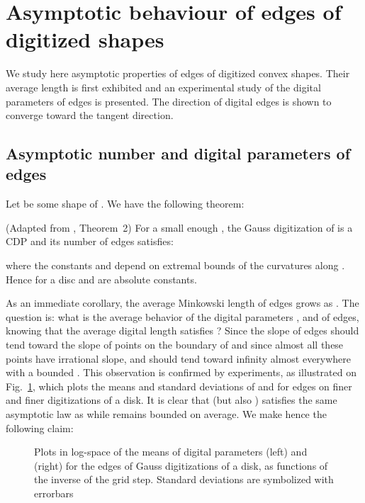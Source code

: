 \documentclass{llncs}
\newcommand{\refFigure}[1]{Fig.~\ref{#1}}
\begin{document}
\section{Asymptotic behaviour of edges of digitized shapes}

We study here asymptotic properties of edges of digitized convex
shapes. Their average length is first exhibited and an experimental
study of the digital parameters of edges is presented. The direction of
digital edges is shown to converge toward the tangent direction. 

\subsection{Asymptotic number and digital parameters of edges}

Let  be some shape of . We have the following theorem:

\begin{theorem}{(Adapted from \cite{Balog1991}, Theorem~2)}
  \label{thm:Balog:nbV1} 
  For a small enough , the Gauss digitization  of 
  is a CDP and its number of edges  
  satisfies:
  
  where the constants  and  depend on extremal
  bounds of the curvatures along . Hence for a disc  and
   are absolute constants.
\end{theorem}

As an immediate corollary, the average Minkowski 
length of edges grows as . The question is:
what is the average behavior of the digital parameters ,  and
 of edges, knowing that the average digital length
 satisfies
 ? Since the slope
of edges should tend toward the slope of points on the boundary of 
and since almost all these points have irrational slope,  and 
should tend toward infinity almost everywhere with a bounded
. This observation is confirmed by experiments, as illustrated
on \refFigure{fig:pqdCircle}, which plots the means and standard
deviations of  and  for edges on finer and finer
digitizations of a disk. It is clear that  (but also ) satisfies
the same asymptotic law as  while  remains bounded on
average. We make hence the following claim:

\begin{figure}[tbp]
  \begin{center}
  \end{center}
  \caption{Plots in log-space of the means of digital parameters
     (left) and  (right) for the edges of Gauss
    digitizations of a disk, as functions of the inverse 
    of the grid step. Standard deviations are symbolized with
    errorbars
    \label{fig:pqdCircle} }
\end{figure} 
\end{document}
